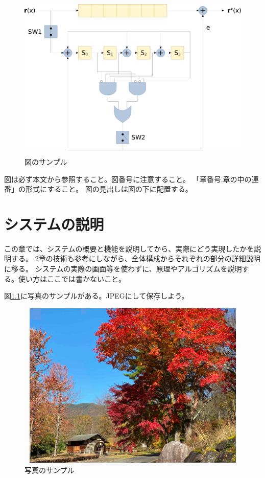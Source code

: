 \documentclass[12pt]{jreport}
\begin{document}
\begin{figure}[htb]
    \begin{center}
        \includegraphics[width=12cm,height=8cm]{decode7_4_10111_no_margin-crop.pdf}
    \end{center}
    \caption{図のサンプル
        \label{fig:pm1}
    }
\end{figure}

図は必ず本文から参照すること。図番号に注意すること。
「章番号.章の中の連番」の形式にすること。
図の見出しは図の下に配置する。

\chapter{システムの説明}
この章では、システムの概要と機能を説明してから、実際にどう実現したかを説明する。
2章の技術も参考にしながら、全体構成からそれぞれの部分の詳細説明に移る。
システムの実際の画面等を使わずに、原理やアルゴリズムを説明する。使い方はここでは書かないこと。

図\ref{fig:pm2}に写真のサンプルがある。JPEGにして保存しよう。

\begin{figure}[htb]
    \begin{center}
        \includegraphics[width=12cm,height=8cm]{kazakosi.jpg}
    \end{center}
    \caption{写真のサンプル
        \label{fig:pm2}
    }
\end{figure}
\end{document}
